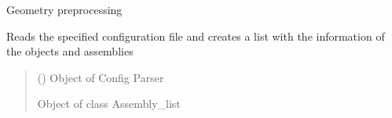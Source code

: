 \documentclass[letterpaper,10pt,english]{sphinxmanual}
\begin{document}

\begin{fulllineitems}
\label{\detokenize{modules:configuration.read_geometry}}
\pysigstartsignatures
{}
\pysigstopsignatures
\sphinxAtStartPar
Geometry pre\sphinxhyphen{}processing

\sphinxAtStartPar
Reads the specified configuration file and creates a list with the information of the objects and assemblies
\begin{quote}\begin{description}
\sphinxAtStartPar
{} () \textendash{} Object of Config Parser

\sphinxAtStartPar
{} \textendash{} Object of class Assembly\_list

\sphinxAtStartPar
{\hyperref[\detokenize{modules:assembly.Assembly_list}]{}}

\end{description}\end{quote}

\end{fulllineitems}

\end{document}

